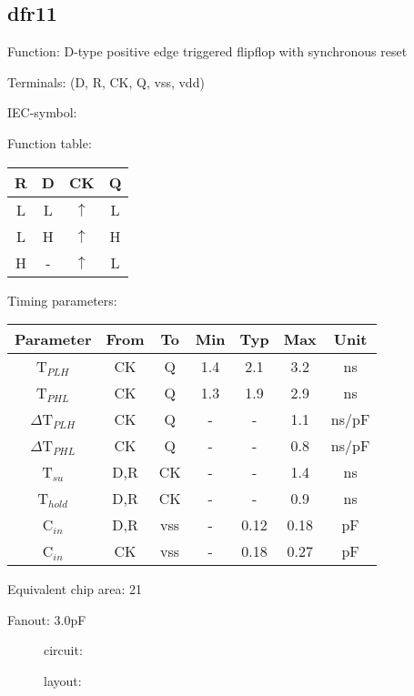 \subsection{dfr11}
Function: D-type positive edge triggered flipflop with synchronous reset

Terminals: (D, R, CK, Q, vss, vdd)


IEC-symbol:
\begin{figure}[bth]
\end{figure}

Function table:
\begin{table}[bth]
\begin{tabular}{|c|c|c||c|}
\hline
R	&D	&CK		&Q\\
\hline
L	&L	&$\uparrow$	&L\\
L	&H	&$\uparrow$	&H\\
H	&-	&$\uparrow$	&L\\
\hline
\end{tabular}
\vspace{1cm}

Timing parameters:\\

\begin{tabular}{|c|cc|ccc|c|}
\hline
Parameter               &From            &To   &Min	&Typ	&Max    &Unit\\
\hline
T$_{PLH}$               &CK     	&Q     &1.4	&2.1	&3.2    &ns\\
T$_{PHL}$               &CK    		&Q     &1.3	&1.9	&2.9    &ns\\
\hline
$\Delta$T$_{PLH}$       &CK          	&Q	&-	&-	&1.1    &ns/pF\\
$\Delta$T$_{PHL}$       &CK           	&Q    	&-	&-	&0.8    &ns/pF\\
\hline
T$_{su}$		&D,R		&CK	&-	&-	&1.4	&ns\\
T$_{hold}$		&D,R		&CK	&-	&-	&0.9	&ns\\
\hline
C$_{in}$                &D,R	    	&vss    &-	&0.12	&0.18   &pF\\
C$_{in}$                &CK	    	&vss    &-	&0.18	&0.27   &pF\\
\hline
\end{tabular}
\end{table}

Equivalent chip area: 21

Fanout: 3.0pF


\begin{figure}[t]
circuit:\\



layout:\\

\end{figure}


\clearpage

